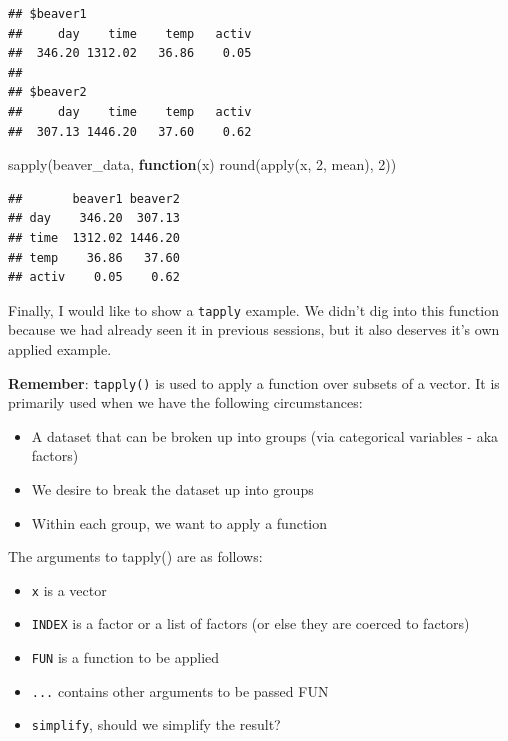 \documentclass[
]{book}
\newenvironment{Shaded}{\begin{snugshade}}{\end{snugshade}}
\newcommand{\ControlFlowTok}[1]{\textcolor[rgb]{0.13,0.29,0.53}{\textbf{#1}}}
\newcommand{\DecValTok}[1]{\textcolor[rgb]{0.00,0.00,0.81}{#1}}
\newcommand{\FunctionTok}[1]{\textcolor[rgb]{0.00,0.00,0.00}{#1}}
\newcommand{\NormalTok}[1]{#1}
\providecommand{\tightlist}{%
  \setlength{\itemsep}{0pt}\setlength{\parskip}{0pt}}
\theoremstyle{definition}
\theoremstyle{definition}
\theoremstyle{definition}
\theoremstyle{definition}
\theoremstyle{remark}
\begin{document}
\begin{verbatim}
## $beaver1
##     day    time    temp   activ 
##  346.20 1312.02   36.86    0.05 
## 
## $beaver2
##     day    time    temp   activ 
##  307.13 1446.20   37.60    0.62
\end{verbatim}

\begin{Shaded}
\begin{Highlighting}[]
\FunctionTok{sapply}\NormalTok{(beaver\_data, }\ControlFlowTok{function}\NormalTok{(x) }\FunctionTok{round}\NormalTok{(}\FunctionTok{apply}\NormalTok{(x, }\DecValTok{2}\NormalTok{, mean), }\DecValTok{2}\NormalTok{))}
\end{Highlighting}
\end{Shaded}

\begin{verbatim}
##       beaver1 beaver2
## day    346.20  307.13
## time  1312.02 1446.20
## temp    36.86   37.60
## activ    0.05    0.62
\end{verbatim}

Finally, I would like to show a \texttt{tapply} example. We didn't dig into this function because we had already seen it in previous sessions, but it also deserves it's own applied example.

\textbf{Remember}: \texttt{tapply()} is used to apply a function over subsets of a vector. It is primarily used when we have the following circumstances:

\begin{itemize}
\tightlist
\item
  A dataset that can be broken up into groups (via categorical variables - aka factors)
\item
  We desire to break the dataset up into groups
\item
  Within each group, we want to apply a function
\end{itemize}

The arguments to tapply() are as follows:

\begin{itemize}
\tightlist
\item
  \texttt{x} is a vector
\item
  \texttt{INDEX} is a factor or a list of factors (or else they are coerced to factors)
\item
  \texttt{FUN} is a function to be applied
\item
  \texttt{...} contains other arguments to be passed FUN
\item
  \texttt{simplify}, should we simplify the result?
\end{itemize}
\end{document}
